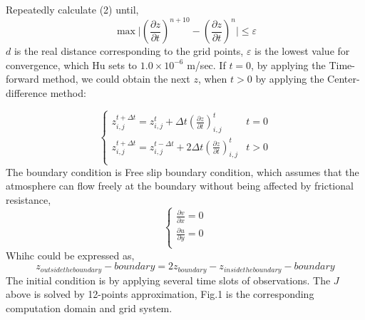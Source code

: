 \documentclass{article}
\begin{document}
\begin{sloppypar}
\begin{equation}
\end{equation}
\noindent Repeatedly calculate (2) until,\newline
\begin{equation}
    \max\lvert(\frac{\partial{z}}{\partial{t}})^{n+10}-(\frac{\partial{z}}{\partial{t}})^{n}\rvert\leq\varepsilon
\end{equation}
$d$ is the real distance corresponding to the grid points, $\varepsilon$ is the lowest value for convergence, which Hu sets to $1.0\times10^{-6}$ m/sec. If $t=0$, by applying the Time-forward method, we could obtain the next $z$,
when $t>0$ by applying the Center-difference method:

\begin{equation}
    \begin{cases}
        z^{t+\Delta{t}}_{i,j}=z^{t}_{i,j}+\Delta{t}(\frac{\partial{z}}{\partial{t}})^{t}_{i,j}            & t=0 \\
        z^{t+\Delta{t}}_{i,j}=z^{t-\Delta{t}}_{i,j}+2\Delta{t}(\frac{\partial{z}}{\partial{t}})^{t}_{i,j} & t>0 \\
    \end{cases}
\end{equation}
The boundary condition is Free slip boundary condition, which assumes that the atmosphere can flow freely at the boundary without being affected by frictional resistance, \newline
\begin{equation}
    \begin{cases}
        \frac{\partial v}{\partial x}=0 \\ \frac{\partial u}{\partial y}=0 \\
    \end{cases}
\end{equation}
Whihc could be expressed as, \newline
\begin{equation}
    z_{outside the boundary}-boundary = 2z_{boundary} - z_{inside the boundary}-boundary
\end{equation}
The initial condition is by applying several time slots of observations.
The $J$ above is solved by 12-points approximation, Fig.1 is the corresponding computation domain and grid system. \newline


\end{sloppypar}
\end{document}
